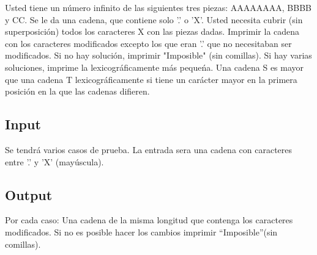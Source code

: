 
Usted tiene un n\'umero infinito de las siguientes tres piezas: AAAAAAAA, BBBB y CC.
Se le da una cadena, que contiene solo '.' o 'X'. Usted necesita cubrir (sin superposici\'on) todos los caracteres X con las piezas dadas.
Imprimir la cadena con los caracteres modificados excepto los que eran '.' que no necesitaban ser modificados.
Si no hay soluci\'on, imprimir "Imposible" (sin comillas).
Si hay varias soluciones, imprime la lexicogr\'aficamente m\'as peque\'na.
Una cadena S es mayor que una cadena T lexicogr\'aficamente si tiene un car\'acter mayor en la primera posici\'on en la que las cadenas difieren.

\subsection*{Input}

Se tendr\'a varios casos de prueba. La entrada sera una cadena con caracteres entre '.' y 'X' (may\'uscula).

\subsection*{Output}

Por cada caso:
Una cadena de la misma longitud que contenga los caracteres modificados. Si no es posible hacer los cambios imprimir ``Imposible''(sin comillas).

\datos
